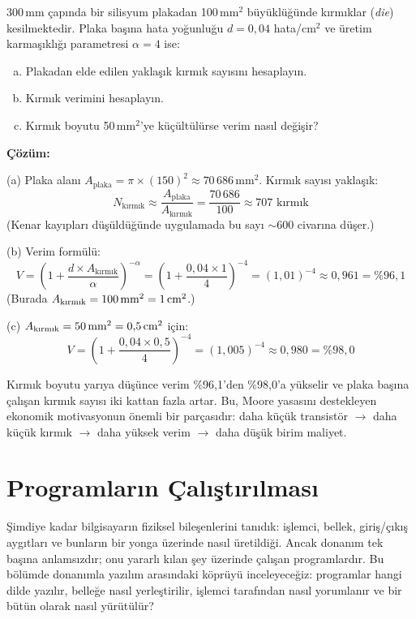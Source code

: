 \begin{ornek}[1.4]
\label{orn:verim-hesaplama}
300\,mm çapında bir silisyum plakadan 100\,mm$^2$ büyüklüğünde kırmıklar (\emph{die}) kesilmektedir. Plaka başına hata yoğunluğu $d = 0{,}04$ hata/cm$^2$ ve üretim karmaşıklığı parametresi $\alpha = 4$ ise:
\begin{enumerate}[(a)]
\item Plakadan elde edilen yaklaşık kırmık sayısını hesaplayın.
\item Kırmık verimini hesaplayın.
\item Kırmık boyutu 50\,mm$^2$'ye küçültülürse verim nasıl değişir?
\end{enumerate}

\textbf{Çözüm:}

(a) Plaka alanı $A_{\text{plaka}} = \pi \times (150)^2 \approx 70\,686$\,mm$^2$. Kırmık sayısı yaklaşık:
\[
N_{\text{kırmık}} \approx \frac{A_{\text{plaka}}}{A_{\text{kırmık}}} = \frac{70\,686}{100} \approx 707 \text{ kırmık}
\]
(Kenar kayıpları düşüldüğünde uygulamada bu sayı $\sim$600 civarına düşer.)

(b) Verim formülü:
\[
V = \left(1 + \frac{d \times A_{\text{kırmık}}}{\alpha}\right)^{-\alpha} = \left(1 + \frac{0{,}04 \times 1}{4}\right)^{-4} = (1{,}01)^{-4} \approx 0{,}961 = \%96{,}1
\]
(Burada $A_{\text{kırmık}} = 100\text{\,mm}^2 = 1\text{\,cm}^2$.)

(c) $A_{\text{kırmık}} = 50\text{\,mm}^2 = 0{,}5\text{\,cm}^2$ için:
\[
V = \left(1 + \frac{0{,}04 \times 0{,}5}{4}\right)^{-4} = (1{,}005)^{-4} \approx 0{,}980 = \%98{,}0
\]

Kırmık boyutu yarıya düşünce verim \%96,1'den \%98,0'a yükselir ve plaka başına çalışan kırmık sayısı iki kattan fazla artar. Bu, Moore yasasını destekleyen ekonomik motivasyonun önemli bir parçasıdır: daha küçük transistör $\rightarrow$ daha küçük kırmık $\rightarrow$ daha yüksek verim $\rightarrow$ daha düşük birim maliyet.
\end{ornek}


\section{Programların Çalıştırılması}
\label{sec:program-calistirma}

Şimdiye kadar bilgisayarın fiziksel bileşenlerini tanıdık: işlemci, bellek, giriş/çıkış aygıtları ve bunların bir yonga üzerinde nasıl üretildiği. Ancak donanım tek başına anlamsızdır; onu yararlı kılan şey üzerinde çalışan programlardır. Bu bölümde donanımla yazılım arasındaki köprüyü inceleyeceğiz: programlar hangi dilde yazılır, belleğe nasıl yerleştirilir, işlemci tarafından nasıl yorumlanır ve bir bütün olarak nasıl yürütülür?

